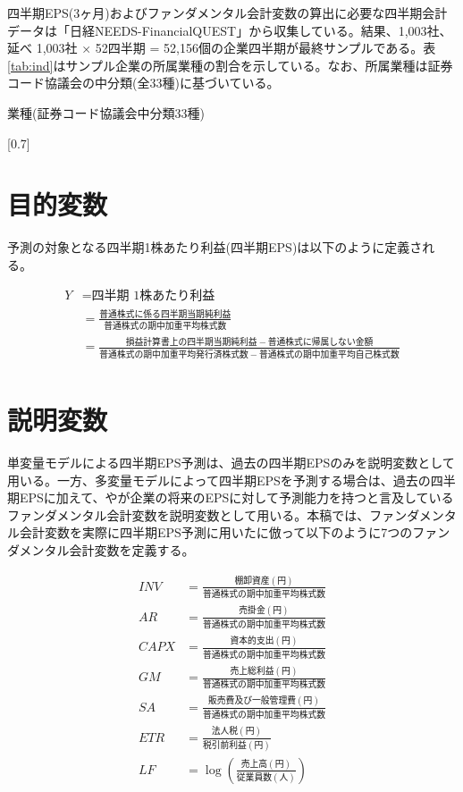 \documentclass[a4paper, 12pt]{jsarticle}
\begin{document}
四半期EPS(3ヶ月)およびファンダメンタル会計変数の算出に必要な四半期会計データは「日経NEEDS-FinancialQUEST」から収集している。結果、1,003社、延べ 1,003社 × 52四半期 = 52,156個の企業四半期が最終サンプルである。表\ref{tab:ind}はサンプル企業の所属業種の割合を示している。なお、所属業種は証券コード協議会の中分類(全33種)に基づいている。

\begin{table}
  \centering
  \caption{業種(証券コード協議会中分類33種)}
  \label{tab:ind}
  \scalebox{0.7}[0.7]{
    
  }
\end{table}

\section{目的変数}

予測の対象となる四半期1株あたり利益(四半期EPS)は以下のように定義される。

\begin{equation}
  \begin{split}
    Y &= \text{四半期 1株あたり利益} \\
    &= \frac{普通株式に係る四半期当期純利益}{普通株式の期中加重平均株式数} \\
    &= \frac{損益計算書上の四半期当期純利益-普通株式に帰属しない金額}{普通株式の期中加重平均発行済株式数 - 普通株式の期中加重平均自己株式数} \\  
  \end{split}
\end{equation}

\section{説明変数}

単変量モデルによる四半期EPS予測は、過去の四半期EPSのみを説明変数として用いる。一方、多変量モデルによって四半期EPSを予測する場合は、過去の四半期EPSに加えて、\cite{lev1993fundamental}や\cite{abarbanell1997fundamental}が企業の将来のEPSに対して予測能力を持つと言及しているファンダメンタル会計変数を説明変数として用いる。本稿では、ファンダメンタル会計変数を実際に四半期EPS予測に用いた\cite{zhang2004neural}に倣って以下のように7つのファンダメンタル会計変数を定義する。

\begin{equation}
  \begin{split}
    INV &= \frac{棚卸資産(円)}{普通株式の期中加重平均株式数} \\
    AR &= \frac{売掛金(円)}{普通株式の期中加重平均株式数} \\
    CAPX &= \frac{資本的支出(円)}{普通株式の期中加重平均株式数} \\
    GM &= \frac{売上総利益(円)}{普通株式の期中加重平均株式数} \\
    SA &= \frac{販売費及び一般管理費(円)}{普通株式の期中加重平均株式数} \\
    ETR &= \frac{法人税(円)}{税引前利益(円)} \\
    LF &= \log{\left(\frac{売上高(円)}{従業員数(人)}\right)} \\
  \end{split}
\end{equation}
\end{document}
